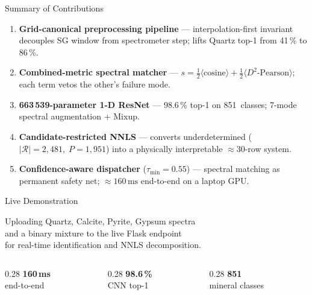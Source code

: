 \documentclass[aspectratio=169,10pt]{beamer}
\begin{document}
\begin{frame}{Summary of Contributions}
  \begin{enumerate}\setlength\itemsep{0.18cm}\small
    \item \textbf{Grid-canonical preprocessing pipeline} ---
          interpolation-first invariant decouples SG window from
          spectrometer step; lifts Quartz top-1 from 41\,\% to 86\,\%.

    \item \textbf{Combined-metric spectral matcher} ---
          $s=\tfrac{1}{2}\langle\text{cosine}\rangle
            +\tfrac{1}{2}\langle D^2\text{-Pearson}\rangle$;
          each term vetos the other's failure mode.

    \item \textbf{663\,539-parameter 1-D ResNet} ---
          98.6\,\% top-1 on 851~classes; 7-mode spectral augmentation
          $+$ Mixup.

    \item \textbf{Candidate-restricted NNLS} ---
          converts underdetermined ($|\mathcal{R}|{=}2{,}481,\;P{=}1{,}951$)
          into a physically interpretable $\approx30$-row system.

    \item \textbf{Confidence-aware dispatcher} ($\tau_{\min}=0.55$) ---
          spectral matching as permanent safety net;
          $\approx160\,\text{ms}$ end-to-end on a laptop GPU.
  \end{enumerate}
\end{frame}

\begin{frame}[standout]
  \Huge Live Demonstration

  \vspace{0.5cm}
  \normalsize
  Uploading Quartz, Calcite, Pyrite, Gypsum spectra\\
  and a binary mixture to the live Flask endpoint\\
  for real-time identification and NNLS decomposition.

  \vspace{0.5cm}
  \begin{columns}[c]
    \begin{column}{0.28\textwidth}
      \centering
      {\large\bfseries 160\,ms}\\[2pt]
      {\small end-to-end}
    \end{column}
    \begin{column}{0.28\textwidth}
      \centering
      {\large\bfseries 98.6\,\%}\\[2pt]
      {\small CNN top-1}
    \end{column}
    \begin{column}{0.28\textwidth}
      \centering
      {\large\bfseries 851}\\[2pt]
      {\small mineral classes}
    \end{column}
  \end{columns}
\end{frame}
\end{document}
